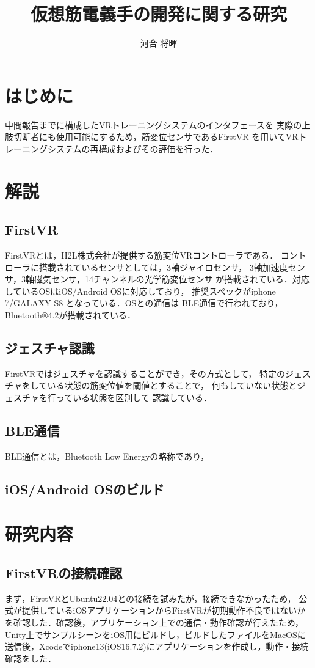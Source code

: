 \documentclass{ltjsarticle}
\title{仮想筋電義手の開発に関する研究}
\author{河合 将暉}
\begin{document}
\maketitle

\section{はじめに}
	中間報告までに構成したVRトレーニングシステムのインタフェースを
	実際の上肢切断者にも使用可能にするため，筋変位センサであるFirstVR
	を用いてVRトレーニングシステムの再構成およびその評価を行った．
\section{解説}
	\subsection{FirstVR}
		FirstVRとは，H2L株式会社が提供する筋変位VRコントローラである．
		コントローラに搭載されているセンサとしては，3軸ジャイロセンサ，
		3軸加速度センサ，3軸磁気センサ，14チャンネルの光学筋変位センサ
		が搭載されている．対応しているOSはiOS/Android OSに対応しており，
		推奨スペックがiphone 7/GALAXY S8 となっている．OSとの通信は
		BLE通信で行われており，Bluetooth®4.2が搭載されている．

	\subsection{ジェスチャ認識}
		FirstVRではジェスチャを認識することができ，その方式として，
		特定のジェスチャをしている状態の筋変位値を閾値とすることで，
		何もしていない状態とジェスチャを行っている状態を区別して
		認識している．
	\subsection{BLE通信}
		BLE通信とは，Bluetooth Low Energyの略称であり，
	\subsection{iOS/Android OSのビルド}

\section{研究内容}
	\subsection{FirstVRの接続確認}
		まず，FirstVRとUbuntu22.04との接続を試みたが，接続できなかったため，
		公式が提供しているiOSアプリケーションからFirstVRが初期動作不良ではないか
		を確認した．確認後，アプリケーション上での通信・動作確認が行えたため，
		Unity上でサンプルシーンをiOS用にビルドし，ビルドしたファイルをMacOSに
		送信後，Xcodeでiphone13(iOS16.7.2)にアプリケーションを作成し，動作・接続確認をした．
\end{document}
